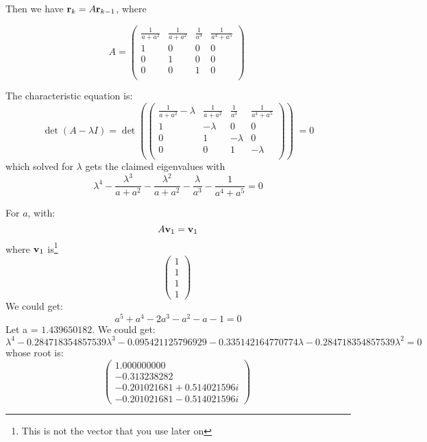 Then we have $\mathbf{r}_k=A\mathbf{r}_{k-1}$, where 

\begin{equation}
A = 
\begin{pmatrix}
\frac{1}{a+a^2} & \frac{1}{a+a^2} & \frac{1}{a^3} & \frac{1}{a^4+a^5}  \\
1               & 0               & 0             & 0                  \\
0               & 1               & 0             & 0                   \\
0               & 0               & 1             & 0                   \\
\end{pmatrix}\;
\end{equation}

The characteristic equation is:
\begin{equation}
\det(A-\lambda I)=\det\left(\begin{pmatrix}
\frac{1}{a+a^2} - \lambda & \frac{1}{a+a^2} & \frac{1}{a^3} &                \frac{1}{a^4+a^5}                                                \\
1               & -\lambda        & 0             & 0             \\
0               & 1               & -\lambda      & 0             \\
0               & 0               & 1             & -\lambda       \\
\end{pmatrix}\right)\;
=0
\end{equation}
which solved for $\lambda$ gets the claimed eigenvalues with
\begin{equation}
\lambda^4-\frac{\lambda^3}{a+a^2}-\frac{\lambda^2}{a+a^2}-\frac{\lambda}{a^3}-\frac{1}{a^4+a^5} = 0
\end{equation}

For $a$, with:
\begin{equation}
A \mathbf{v}_1 = \mathbf{v}_1
\end{equation}
where $\mathbf{v}_1$ is\footnote{This is not the vector that you use later on}
$$\begin{pmatrix}
1 \\
1 \\
1 \\
1
\end{pmatrix}\;$$
We could get:
$$ a^5 + a^4 -2 a^3 -a^2 -a -1=0 $$
Let a = $1.439650182$. 
We could get:
$$ \lambda^4 -0.284718354857539 \lambda^3 -0.095421125796929-0.335142164770774 \lambda -0.284718354857539 \lambda^2 = 0$$
whose root is:
$$\begin{pmatrix}
1.000000000 \\
-0.313238282 \\
- 0.201021681 + 0.514021596i \\
- 0.201021681 - 0.514021596i
\end{pmatrix}\;$$


